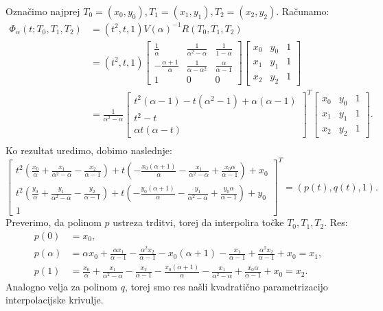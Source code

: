 \documentclass[mat1]{fmfdelo}
\newcommand{\al}{\alpha}
\begin{document}
\begin{dokaz}
Označimo najprej $T_0 = (x_0, y_0), T_1 = (x_1, y_1), T_2 = (x_2, y_2)$. Računamo:
\begin{align*}
\Phi_\al(t; T_0, T_1, T_2) &=  (t^2, t, 1) V(\al)^{-1} R(T_0, T_1, T_2) \\
				&=  (t^2, t, 1)  
\begin{bmatrix}
\frac{1}{\al} & \frac{1}{\al^2 - \al} & \frac{1}{1-\al} \\
- \frac{\al + 1}{\al} & \frac{1}{\al - \al^2} & \frac{\al}{\al-1} \\
1 & 0 & 0
\end{bmatrix}
\begin{bmatrix}
x_0 & y_0 & 1 \\
x_1 & y_1 & 1 \\
x_2 & y_2 & 1 
\end{bmatrix}
\\
				&= \frac{1}{\al^2 - \al} 
\begin{bmatrix}
t^2(\al - 1) - t(\al^2 - 1) + \al(\al - 1) \\
 t^2 - t \\
\al t(\al - t)
\end{bmatrix}
^T
\begin{bmatrix}
x_0 & y_0 & 1 \\
x_1 & y_1 & 1 \\
x_2 & y_2 & 1 
\end{bmatrix}
.\\
\end{align*}
Ko rezultat uredimo, dobimo naslednje: 
$$ 
\begin{bmatrix}
t^2 ( \frac{x_0}{\al} + \frac{x_1}{\al^2 - \al} - \frac{x_2}{\al -1} ) + t(- \frac{x_0(\al + 1)}{\al} - \frac{x_1}{\al^2 - \al} + \frac{x_0 \al}{\al - 1}) + x_0 \\
t^2 ( \frac{y_0}{\al} + \frac{y_1}{\al^2 - \al} - \frac{y_2}{\al -1} ) + t(- \frac{y_0(\al + 1)}{\al} - \frac{y_1}{\al^2 - \al} + \frac{y_0 \al}{\al - 1}) + y_0 \\
1
\end{bmatrix}
^T
= (p(t), q(t), 1).
$$
Preverimo, da polinom $p$ ustreza trditvi, torej da interpolira točke $T_0, T_1, T_2$. Res:
\begin{align*}
p(0) &= x_0, \\
p(\al) &= \al x_0 + \frac{\al x_1}{\al - 1} - \frac{\al^2 x_2}{\al - 1} - x_0(\al + 1) - \frac{x_1}{\al - 1} + \frac{\al^2 x_2}{\al - 1} + x_0 = x_1, \\
p(1) &= \frac{x_0}{\al} + \frac{x_1}{\al^2 - \al} - \frac{x_2}{\al -1} - \frac{x_0(\al + 1)}{\al} - \frac{x_1}{\al^2 - \al} + \frac{x_0 \al}{\al - 1} + x_0 = x_2.
\end{align*}
Analogno velja za polinom $q$, torej smo res našli kvadratično parametrizacijo interpolacijske krivulje.
\end{dokaz}
\end{document}

